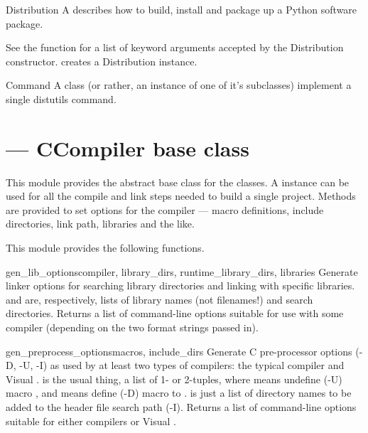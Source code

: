 \documentclass{manual}
\begin{document}
\begin{classdesc*}{Distribution}
A  describes how to build, install and package up a
Python software package. 

See the  function for a list of keyword arguments accepted 
by the Distribution constructor.  creates a Distribution
instance.
\end{classdesc*}

\begin{classdesc*}{Command}
A  class (or rather, an instance of one of it's subclasses)
implement a single distutils command.
\end{classdesc*}


\section{ --- CCompiler base class}

This module provides the abstract base class for the  
classes.  A  instance can be used for all the compile 
and link steps needed to build a single project. Methods are provided to 
set options for the compiler --- macro definitions, include directories, 
link path, libraries and the like.

This module provides the following functions.

\begin{funcdesc}{gen_lib_options}{compiler, library_dirs, runtime_library_dirs, libraries}
Generate linker options for searching library directories and
linking with specific libraries.   and  are,
respectively, lists of library names (not filenames!) and search
directories.  Returns a list of command-line options suitable for use
with some compiler (depending on the two format strings passed in).
\end{funcdesc}
    
\begin{funcdesc}{gen_preprocess_options}{macros, include_dirs}
Generate C pre-processor options (-D, -U, -I) as used by at least
two types of compilers: the typical \UNIX{} compiler and Visual \Cpp.
 is the usual thing, a list of 1- or 2-tuples, where 
means undefine (-U) macro , and  means define (-D)
macro  to .   is just a list of directory
names to be added to the header file search path (-I).  Returns a list
of command-line options suitable for either \UNIX{} compilers or Visual
\Cpp.
\end{funcdesc}
\end{document}
